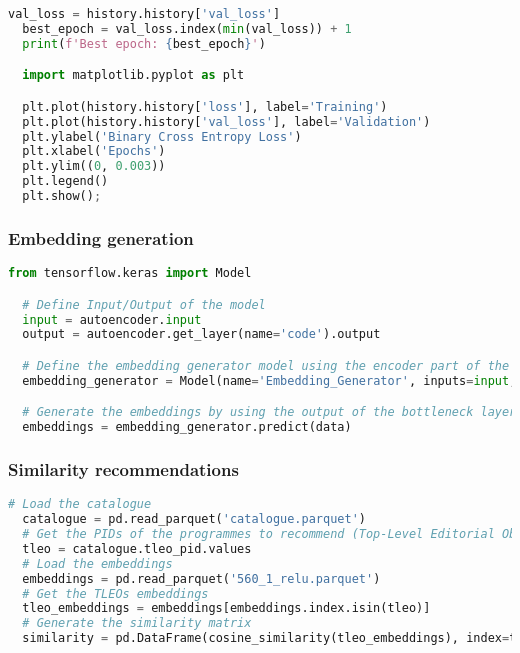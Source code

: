 \begin{lstlisting}[language=Python, caption=Binary cross-entropy loss visualisation]
  val_loss = history.history['val_loss']
  best_epoch = val_loss.index(min(val_loss)) + 1
  print(f'Best epoch: {best_epoch}')

  import matplotlib.pyplot as plt

  plt.plot(history.history['loss'], label='Training')
  plt.plot(history.history['val_loss'], label='Validation')
  plt.ylabel('Binary Cross Entropy Loss')
  plt.xlabel('Epochs')
  plt.ylim((0, 0.003))
  plt.legend()
  plt.show();
\end{lstlisting}

\subsubsection{Embedding generation}

\begin{lstlisting}[language=Python, caption=Embedding generation]
  from tensorflow.keras import Model

  # Define Input/Output of the model
  input = autoencoder.input
  output = autoencoder.get_layer(name='code').output

  # Define the embedding generator model using the encoder part of the trained Autoencoder model
  embedding_generator = Model(name='Embedding_Generator', inputs=input, outputs=output)

  # Generate the embeddings by using the output of the bottleneck layer
  embeddings = embedding_generator.predict(data)
\end{lstlisting}

\subsubsection{Similarity recommendations}

\begin{lstlisting}[language=Python, caption=Cosine similarity calculation]
  # Load the catalogue
  catalogue = pd.read_parquet('catalogue.parquet')
  # Get the PIDs of the programmes to recommend (Top-Level Editorial Objects)
  tleo = catalogue.tleo_pid.values
  # Load the embeddings
  embeddings = pd.read_parquet('560_1_relu.parquet')
  # Get the TLEOs embeddings
  tleo_embeddings = embeddings[embeddings.index.isin(tleo)]
  # Generate the similarity matrix
  similarity = pd.DataFrame(cosine_similarity(tleo_embeddings), index=tleo_embeddings.index, columns=tleo_embeddings.index)
\end{lstlisting}


